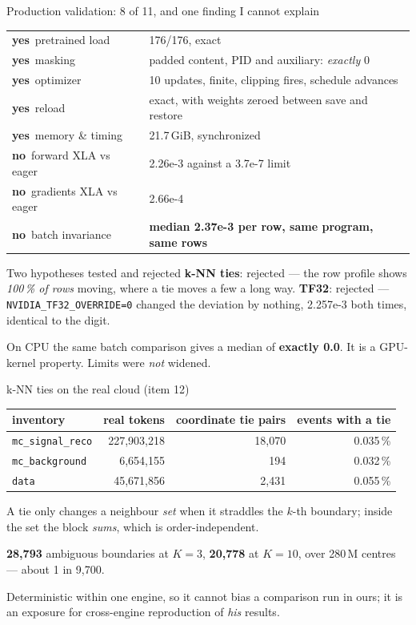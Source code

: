 \documentclass[aspectratio=169,10pt]{beamer}
\newcommand{\NO}{\textcolor{red!70!black}{\textbf{no}}}
\newcommand{\YES}{\textcolor{green!45!black}{\textbf{yes}}}
\begin{document}
\begin{frame}{Production validation: 8 of 11, and one finding I cannot explain}
\begin{center}\small
\begin{tabular}{ll}
\toprule
\YES\ pretrained load & 176/176, exact \\
\YES\ masking & padded content, PID and auxiliary: \emph{exactly} 0 \\
\YES\ optimizer & 10 updates, finite, clipping fires, schedule advances \\
\YES\ reload & exact, with weights zeroed between save and restore \\
\YES\ memory \& timing & 21.7\,GiB, synchronized \\
\NO\ forward XLA vs eager & 2.26e-3 against a 3.7e-7 limit \\
\NO\ gradients XLA vs eager & 2.66e-4 \\
\NO\ batch invariance & \textbf{median 2.37e-3 per row, same program, same rows} \\
\bottomrule
\end{tabular}
\end{center}
\begin{block}{Two hypotheses tested and rejected}
\textbf{k-NN ties}: rejected --- the row profile shows \emph{100\,\% of rows}
moving, where a tie moves a few a long way. \textbf{TF32}: rejected ---
\texttt{NVIDIA\_TF32\_OVERRIDE=0} changed the deviation by nothing, 2.257e-3 both
times, identical to the digit.
\end{block}
On CPU the same batch comparison gives a median of \textbf{exactly 0.0}. It is a
GPU-kernel property. Limits were \emph{not} widened.
\end{frame}

\begin{frame}{k-NN ties on the real cloud (item 12)}
\begin{center}\small
\begin{tabular}{lrrr}
\toprule
inventory & real tokens & coordinate tie pairs & events with a tie \\
\midrule
\texttt{mc\_signal\_reco} & 227{,}903{,}218 & 18{,}070 & 0.035\,\% \\
\texttt{mc\_background}   &   6{,}654{,}155 &      194 & 0.032\,\% \\
\texttt{data}             &  45{,}671{,}856 &  2{,}431 & 0.055\,\% \\
\bottomrule
\end{tabular}
\end{center}
A tie only changes a neighbour \emph{set} when it straddles the $k$-th boundary;
inside the set the block \emph{sums}, which is order-independent.
\begin{center}
\textbf{28{,}793} ambiguous boundaries at $K=3$, \textbf{20{,}778} at $K=10$,
over 280\,M centres --- about 1 in 9{,}700.
\end{center}
Deterministic within one engine, so it cannot bias a comparison run in ours; it is
an exposure for cross-engine reproduction of \emph{his} results.
\end{frame}
\end{document}
